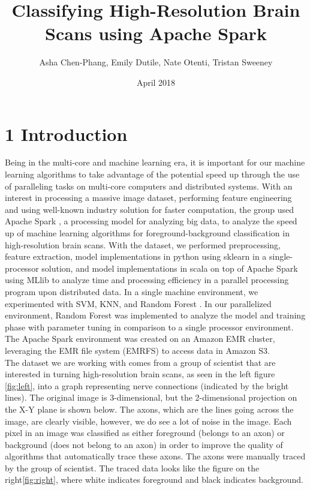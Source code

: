 \documentclass{neu_handout}
\title{Classifying High-Resolution Brain Scans using Apache Spark}
\author{Asha Chen-Phang, Emily Dutile, Nate Otenti, Tristan Sweeney}
\date{April 2018}
\begin{document}
\section*{1 Introduction}
Being in the multi-core and machine learning era, it is important for our machine learning algorithms to take advantage of the potential speed up through the use of paralleling tasks on multi-core computers and distributed systems. With an interest in processing a massive image dataset, performing feature engineering and using well-known industry solution for faster computation, the group used Apache Spark \cite{spark}, a processing model for analyzing big data, to analyze the speed up of machine learning algorithms for foreground-background classification in high-resolution brain scans. With the dataset, we performed preprocessing, feature extraction, model implementations in python using sklearn in a single-processor solution, and model implementations in scala on top of Apache Spark using MLlib to analyze time and processing efficiency in a parallel processing program upon distributed data. In a single machine environment, we experimented with SVM, KNN, and Random Forest \cite{randomforestclassifier}. In our parallelized environment, Random Forest was implemented to analyze the model and training phase with parameter tuning in comparison to a single processor environment. The Apache Spark environment was created on an Amazon EMR \cite{amazonemr} cluster, leveraging the EMR file system (EMRFS) to access data in Amazon S3.\\

The dataset we are working with comes from a group of scientist that are interested in turning high-resolution brain scans, as seen in the left figure \ref{fig:left}, into a graph representing nerve connections (indicated by the bright lines). The original image is 3-dimensional, but the 2-dimensional projection on the X-Y plane is shown below. The axons, which are the lines going across the image, are clearly visible, however, we do see a lot of noise in the image. Each pixel in an image was classified as either foreground (belongs to an axon) or background (does not belong to an axon) in order to improve the quality of algorithms that automatically trace these axons. The axons were manually traced by the group of scientist. The traced data looks like the figure on the right\ref{fig:right}, where white indicates foreground and black indicates background.\\
\end{document}
